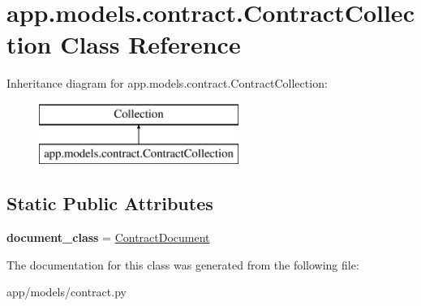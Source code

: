 \hypertarget{classapp_1_1models_1_1contract_1_1_contract_collection}{}\section{app.\+models.\+contract.\+Contract\+Collection Class Reference}
\label{classapp_1_1models_1_1contract_1_1_contract_collection}
Inheritance diagram for app.\+models.\+contract.\+Contract\+Collection\+:\begin{figure}[H]
\begin{center}
\leavevmode
\includegraphics[height=2.000000cm]{classapp_1_1models_1_1contract_1_1_contract_collection}
\end{center}
\end{figure}
\subsection*{Static Public Attributes}
\begin{DoxyCompactItemize}
\item 
\mbox{\label{classapp_1_1models_1_1contract_1_1_contract_collection_a995726be85e509a9919cfedca43a7243}} 
{\bfseries document\+\_\+class} = \hyperlink{classapp_1_1models_1_1contract_1_1_contract_document}{Contract\+Document}
\end{DoxyCompactItemize}


The documentation for this class was generated from the following file\+:\begin{DoxyCompactItemize}
\item 
app/models/contract.\+py\end{DoxyCompactItemize}
